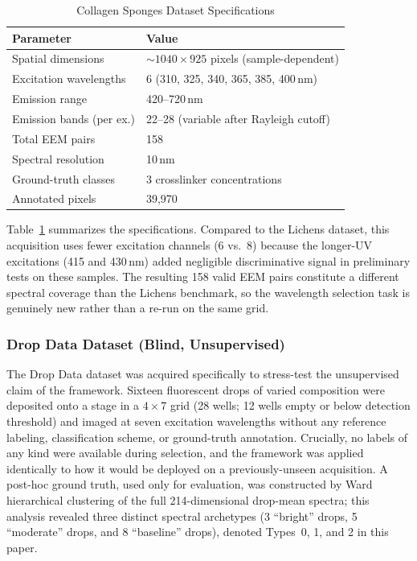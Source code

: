 \begin{table}[!t]
\centering
\caption{Collagen Sponges Dataset Specifications}
\label{tab:dataset_pepsin}
\begin{tabular}{@{}ll@{}}
\toprule
\textbf{Parameter} & \textbf{Value} \\
\midrule
Spatial dimensions & $\sim$$1040 \times 925$ pixels (sample-dependent) \\
Excitation wavelengths & 6 (310, 325, 340, 365, 385, 400\,nm) \\
Emission range & 420--720\,nm \\
Emission bands (per ex.) & 22--28 (variable after Rayleigh cutoff) \\
Total EEM pairs & 158 \\
Spectral resolution & 10\,nm \\
Ground-truth classes & 3 crosslinker concentrations \\
Annotated pixels & 39,970 \\
\bottomrule
\end{tabular}
\end{table}

Table~\ref{tab:dataset_pepsin} summarizes the specifications.
Compared to the Lichens dataset, this acquisition uses fewer excitation channels (6 vs.\ 8) because the longer-UV excitations (415 and 430\,nm) added negligible discriminative signal in preliminary tests on these samples.
The resulting 158 valid EEM pairs constitute a different spectral coverage than the Lichens benchmark, so the wavelength selection task is genuinely new rather than a re-run on the same grid.

\subsubsection{Drop Data Dataset (Blind, Unsupervised)}
\label{sec:dataset_drops}

The Drop Data dataset was acquired specifically to stress-test the unsupervised claim of the framework.
Sixteen fluorescent drops of varied composition were deposited onto a stage in a $4 \times 7$ grid (28 wells; 12 wells empty or below detection threshold) and imaged at seven excitation wavelengths without any reference labeling, classification scheme, or ground-truth annotation.
Crucially, no labels of any kind were available during selection, and the framework was applied identically to how it would be deployed on a previously-unseen acquisition.
A post-hoc ground truth, used only for evaluation, was constructed by Ward hierarchical clustering of the full 214-dimensional drop-mean spectra; this analysis revealed three distinct spectral archetypes (3 ``bright'' drops, 5 ``moderate'' drops, and 8 ``baseline'' drops), denoted Types~0, 1, and 2 in this paper.

